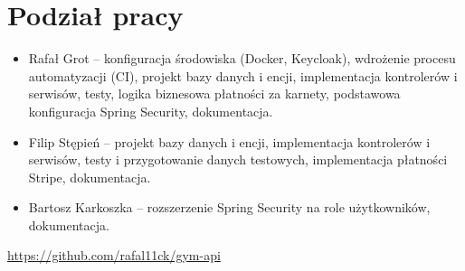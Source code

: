 \documentclass[../../spr.tex]{subfiles}
\begin{document}
\section{Podział pracy}

\begin{itemize}
  \item  Rafał Grot -- konfiguracja środowiska (Docker, Keycloak),
        wdrożenie procesu automatyzacji (CI), projekt bazy danych i encji,
        implementacja kontrolerów i serwisów, testy, logika biznesowa płatności za karnety,
        podstawowa konfiguracja Spring Security, dokumentacja.
  \item Filip Stępień -- projekt bazy danych i encji, implementacja kontrolerów i serwisów, testy i przygotowanie danych testowych, implementacja płatności Stripe, dokumentacja.
  \item Bartosz Karkoszka -- rozszerzenie Spring Security na role użytkowników, dokumentacja.
\end{itemize}

\url{https://github.com/rafal11ck/gym-api}
\end{document}

